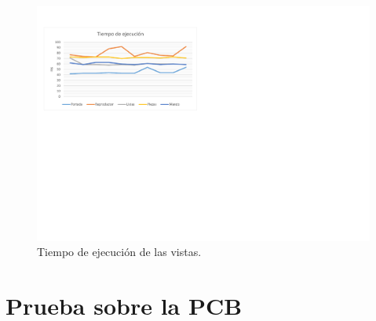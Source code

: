 \smallskip

\begin{figure}[H]
	\noindent \begin{centering}
		\includegraphics[width=\linewidth*3/4]{capitulo6/ejecucion_web}
		\par\end{centering}
	\smallskip
	\caption{\label{fig:ejecucion_web} Tiempo de ejecución de las vistas.}
\end{figure} 

\smallskip

\section{Prueba sobre la PCB}

\smallskip

